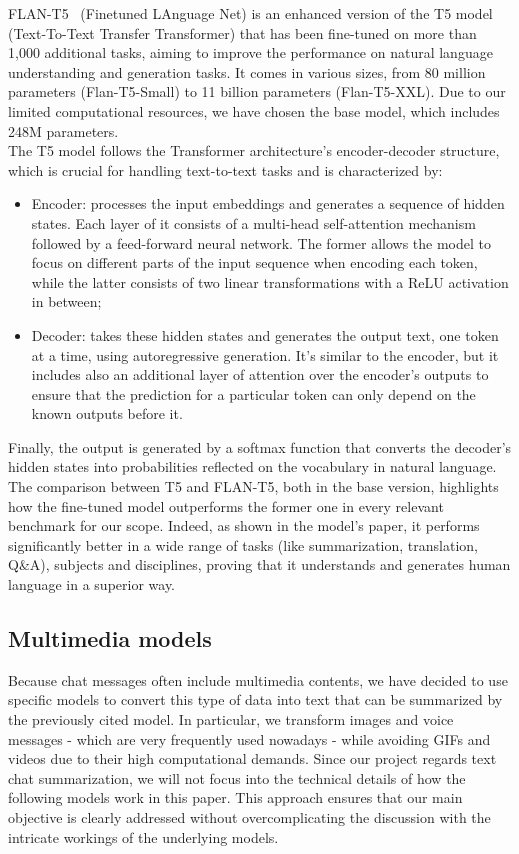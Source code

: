 \documentclass[10pt,twocolumn,letterpaper]{article}
\begin{document}
FLAN-T5~\cite{chung2022scalinginstructionfinetunedlanguagemodels} (Finetuned LAnguage Net) is an enhanced version of the T5 model (Text-To-Text Transfer Transformer) that has been fine-tuned on more than 1,000 additional tasks, aiming to improve the performance on natural language understanding and generation tasks. It comes in various sizes, from 80 million parameters (Flan-T5-Small) to 11 billion parameters (Flan-T5-XXL). Due to our limited computational resources, we have chosen the base model, which includes 248M parameters.\\
The T5 model follows the Transformer architecture’s encoder-decoder structure, which is crucial for handling text-to-text tasks and is characterized by:
\begin{itemize}
    \item Encoder: processes the input embeddings and generates a sequence of hidden states. Each layer of it consists of a multi-head self-attention mechanism followed by a feed-forward neural network. The former allows the model to focus on different parts of the input sequence when encoding each token, while the latter consists of two linear transformations with a ReLU activation in between;
    \item Decoder: takes these hidden states and generates the output text, one token at a time, using autoregressive generation. It's similar to the encoder, but it includes also an additional layer of attention over the encoder’s outputs to ensure that the prediction for a particular token can only depend on the known outputs before it.
\end{itemize}
Finally, the output is generated by a softmax function that converts the decoder's hidden states into probabilities reflected on the vocabulary in natural language. \\
The comparison between T5 and FLAN-T5, both in the base version, highlights how the fine-tuned model outperforms the former one in every relevant benchmark for our scope. Indeed, as shown in the model's paper, it performs significantly better in a wide range of tasks (like summarization, translation, Q\&A), subjects and disciplines, proving that it understands and generates human language in a superior way. 

\subsection{Multimedia models}

Because chat messages often include multimedia contents, we have decided to use specific models to convert this type of data into text that can be summarized by the previously cited model. In particular, we transform images and voice messages - which are very frequently used nowadays - while avoiding GIFs and videos due to their high computational demands. 
Since our project regards text chat summarization, we will not focus into the technical details of how the following models work in this paper. This approach ensures that our main objective is clearly addressed without overcomplicating the discussion with the intricate workings of the underlying models.
\end{document}

